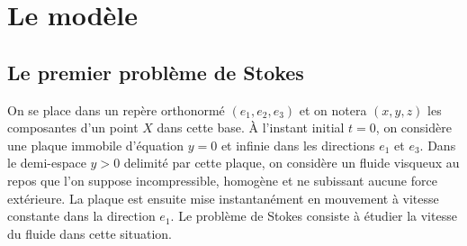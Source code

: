 \section{Le modèle}

\subsection{Le premier problème de Stokes}
On se place dans un repère orthonormé $(e_1,e_2,e_3)$ et on notera $(x,y,z)$ les composantes d'un point $X$ dans cette base. \`A l'instant initial $t=0$, on considère une plaque immobile d'équation $y=0$ et infinie dans les directions $e_1$ et $e_3$. Dans le demi-espace $y>0$ delimité par cette plaque, on considère un fluide visqueux au repos que l'on suppose incompressible, homogène et ne subissant aucune force extérieure. La plaque est ensuite mise instantanément en mouvement à vitesse constante dans la direction $e_1$. Le problème de Stokes consiste à étudier la vitesse du fluide dans cette situation. 
\\
